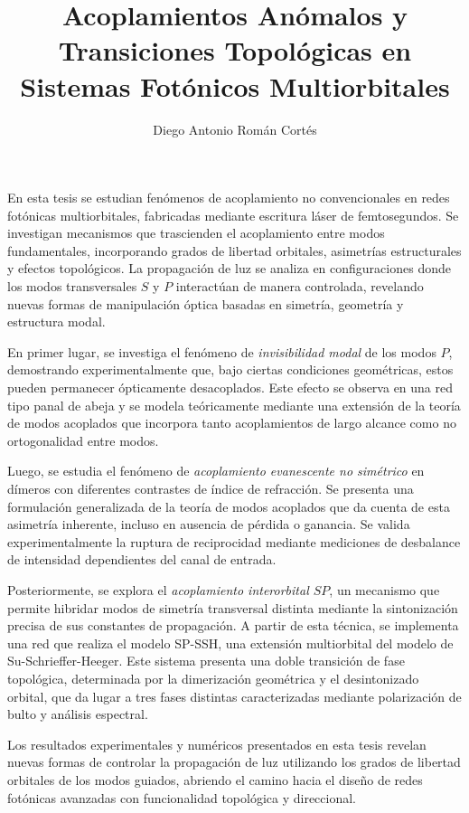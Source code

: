 \documentclass[hyphens]{umemoria}
\author{Diego Antonio Román Cortés}
\title{Acoplamientos Anómalos y Transiciones Topológicas en Sistemas Fotónicos Multiorbitales}
\begin{document}
\frontmatter
\maketitle

\begin{resumen} \hspace{-0.6em} \noindent
	En esta tesis se estudian fenómenos de acoplamiento no convencionales en redes fotónicas multiorbitales, fabricadas mediante escritura láser de femtosegundos. Se investigan mecanismos que trascienden el acoplamiento entre modos fundamentales, incorporando grados de libertad orbitales, asimetrías estructurales y efectos topológicos. La propagación de luz se analiza en configuraciones donde los modos transversales \( S \) y \( P \) interactúan de manera controlada, revelando nuevas formas de manipulación óptica basadas en simetría, geometría y estructura modal.
	
	En primer lugar, se investiga el fenómeno de \textit{invisibilidad modal} de los modos \( P \), demostrando experimentalmente que, bajo ciertas condiciones geométricas, estos pueden permanecer ópticamente desacoplados. Este efecto se observa en una red tipo panal de abeja y se modela teóricamente mediante una extensión de la teoría de modos acoplados que incorpora tanto acoplamientos de largo alcance como no ortogonalidad entre modos.
	
	Luego, se estudia el fenómeno de \textit{acoplamiento evanescente no simétrico} en dímeros con diferentes contrastes de índice de refracción. Se presenta una formulación generalizada de la teoría de modos acoplados que da cuenta de esta asimetría inherente, incluso en ausencia de pérdida o ganancia. Se valida experimentalmente la ruptura de reciprocidad mediante mediciones de desbalance de intensidad dependientes del canal de entrada.
	
	Posteriormente, se explora el \textit{acoplamiento interorbital \( SP \)}, un mecanismo que permite hibridar modos de simetría transversal distinta mediante la sintonización precisa de sus constantes de propagación. A partir de esta técnica, se implementa una red que realiza el modelo SP-SSH, una extensión multiorbital del modelo de Su-Schrieffer-Heeger. Este sistema presenta una doble transición de fase topológica, determinada por la dimerización geométrica y el desintonizado orbital, que da lugar a tres fases distintas caracterizadas mediante polarización de bulto y análisis espectral.
	
	Los resultados experimentales y numéricos presentados en esta tesis revelan nuevas formas de controlar la propagación de luz utilizando los grados de libertad orbitales de los modos guiados, abriendo el camino hacia el diseño de redes fotónicas avanzadas con funcionalidad topológica y direccional.
\end{resumen}
\end{document}
